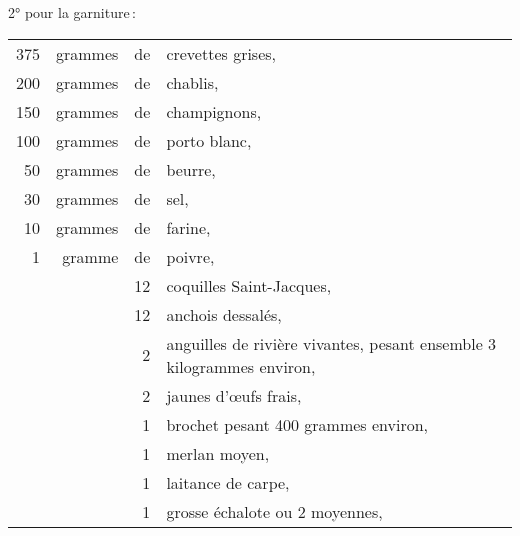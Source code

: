 \medskip

2° pour la garniture :

\medskip

\footnotesize
\begin{longtable}{rrrp{16em}}
    375 & grammes & de & crevettes grises,                                                                \\
    200 & grammes & de & chablis,                                                                         \\
    150 & grammes & de & champignons,                                                                     \\
    100 & grammes & de & porto blanc,                                                                     \\
     50 & grammes & de & beurre,                                                                          \\
     30 & grammes & de & sel,                                                                             \\
     10 & grammes & de & farine,                                                                          \\
      1 & gramme  & de & poivre,                                                                          \\
        &         & 12 & coquilles Saint-Jacques,                                                         \\
        &         & 12 & anchois dessalés,                                                                \\
        &         &  2 & anguilles de rivière vivantes, pesant ensemble 3 kilogrammes environ,            \\
        &         &  2 & jaunes d'œufs frais,                                                             \\
        &         &  1 & brochet pesant 400 grammes environ,                                              \\
        &         &  1 & merlan moyen,                                                                    \\
        &         &  1 & laitance de carpe,                                                               \\
        &         &  1 & grosse échalote ou 2 moyennes,                                                   \\

\end{longtable}
